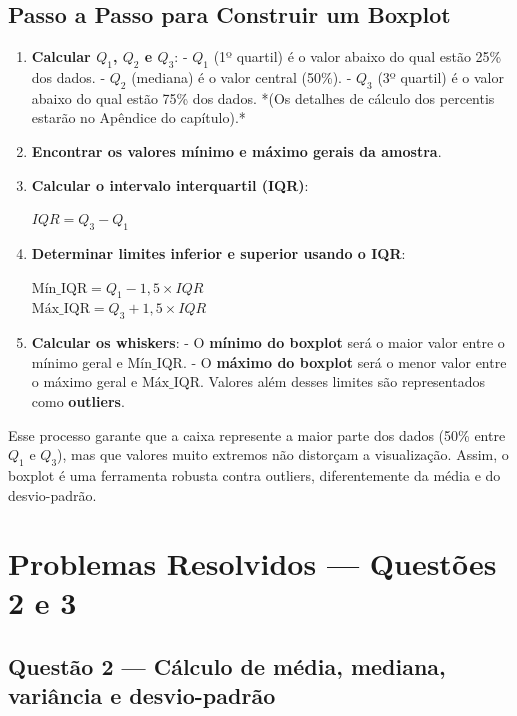 \subsection*{Passo a Passo para Construir um Boxplot}
\begin{enumerate}[leftmargin=*]
  \item \textbf{Calcular $Q_1$, $Q_2$ e $Q_3$}:  
  - $Q_1$ (1º quartil) é o valor abaixo do qual estão 25\% dos dados.  
  - $Q_2$ (mediana) é o valor central (50\%).  
  - $Q_3$ (3º quartil) é o valor abaixo do qual estão 75\% dos dados.  
  *(Os detalhes de cálculo dos percentis estarão no Apêndice do capítulo).*
  
  \item \textbf{Encontrar os valores mínimo e máximo gerais da amostra}.  

  \item \textbf{Calcular o intervalo interquartil (IQR)}:
  \begin{FormulaBox}
  $IQR = Q_3 - Q_1$
  \end{FormulaBox}

  \item \textbf{Determinar limites inferior e superior usando o IQR}:
  \begin{FormulaBox}
  $\text{Mín\_IQR} = Q_1 - 1,5 \times IQR$ \\[4pt]
  $\text{Máx\_IQR} = Q_3 + 1,5 \times IQR$
  \end{FormulaBox}

  \item \textbf{Calcular os whiskers}:  
  - O \textbf{mínimo do boxplot} será o maior valor entre o mínimo geral e $\text{Mín\_IQR}$.  
  - O \textbf{máximo do boxplot} será o menor valor entre o máximo geral e $\text{Máx\_IQR}$.  
  Valores além desses limites são representados como \textbf{outliers}.
\end{enumerate}

Esse processo garante que a caixa represente a maior parte dos dados (50\% entre $Q_1$ e $Q_3$), mas que valores muito extremos não distorçam a visualização.  
Assim, o boxplot é uma ferramenta robusta contra outliers, diferentemente da média e do desvio-padrão.


\section{Problemas Resolvidos — Questões 2 e 3}

\subsection*{Questão 2 — Cálculo de média, mediana, variância e desvio-padrão}

